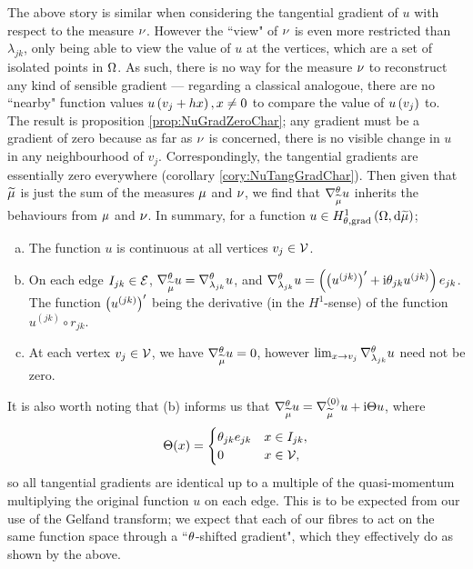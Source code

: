 The above story is similar when considering the tangential gradient of $u$ with respect to the measure $\nu$.
However the ``view" of $\nu$ is even more restricted than $\lambda_{jk}$, only being able to view the value of $u$ at the vertices, which are a set of isolated points in $\Omega$.
As such, there is no way for the measure $\nu$ to reconstruct any kind of sensible gradient --- regarding a classical analogoue, there are no ``nearby" function values $u\left( v_j + h x \right), x\neq 0$ to compare the value of $u\left( v_j \right)$ to.
The result is proposition \ref{prop:NuGradZeroChar}; any gradient must be a gradient of zero because as far as $\nu$ is concerned, there is no visible change in $u$ in any neighbourhood of $v_j$.
Correspondingly, the tangential gradients are essentially zero everywhere (corollary \ref{cory:NuTangGradChar}).
Then given that $\widetilde{\mu}$  is just the sum of the measures $\mu$ and $\nu$, we find that $\nabla^{\theta}_{\widetilde{\mu}}u$ inherits the behaviours from $\mu$ and $\nu$.
In summary, for a function $u\in H^1_{\theta, \mathrm{grad}}\left( \Omega, \mathrm{d}\widetilde{\mu} \right)$;
\begin{enumerate}[(a)]
	\item The function $u$ is continuous at all vertices $v_j\in\mathcal{V}$.
	\item On each edge $I_{jk}\in\mathcal{E}$, $\nabla^{\theta}_{\widetilde{\mu}}u = \nabla^{\theta}_{\lambda_{jk}}u$, and $\nabla^{\theta}_{\lambda_{jk}}u = \left( \left( u^{(jk)} \right)' + \mathrm{i}\theta_{jk}u^{(jk)} \right)e_{jk}$.
	The function $\left( u^{(jk)} \right)'$ being the derivative (in the $H^1$-sense) of the function $u^{(jk)}\circ r_{jk}$.
	\item At each vertex $v_j\in\mathcal{V}$, we have $\nabla^{\theta}_{\widetilde{\mu}}u=0$, however $\lim_{x\rightarrow v_j}\nabla^{\theta}_{\lambda_{jk}}u$ need not be zero.
\end{enumerate}
It is also worth noting that (b) informs us that $\nabla^{\theta}_{\widetilde{\mu}}u = \nabla^{(0)}_{\widetilde{\mu}}u + \mathrm{i}\Theta u$, where 
\begin{align*}
	\Theta(x) = 
	\begin{cases} \theta_{jk}e_{jk} & x\in I_{jk}, \\ 0 & x\in\mathcal{V}, \end{cases}
\end{align*}
so all tangential gradients are identical up to a multiple of the quasi-momentum multiplying the original function $u$ on each edge.
This is to be expected from our use of the Gelfand transform; we expect that each of our fibres to act on the same function space through a ``$\theta$-shifted gradient", which they effectively do as shown by the above.
